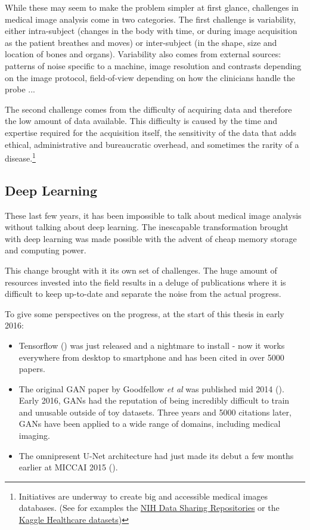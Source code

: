 While these may seem to make the problem simpler at first glance, challenges in medical image analysis come in two categories. The first challenge is variability, either intra-subject (changes in the body with time, or during image acquisition as the patient breathes and moves) or inter-subject (in the shape, size and location of bones and organs). Variability also comes from external sources: patterns of noise specific to a machine, image resolution and contrasts depending on the image protocol, field-of-view depending on how the clinicians handle the probe ... 

The second challenge comes from the difficulty of acquiring data and therefore the low amount of data available. This difficulty is caused by the time and expertise required for the acquisition itself, the sensitivity of the data that adds ethical, administrative and bureaucratic overhead, and sometimes the rarity of a disease.\footnote{Initiatives are underway to create big and accessible medical images databases. (See for examples the \href{https://www.nlm.nih.gov/NIHbmic/nih_data_sharing_repositories.html}{NIH Data Sharing Repositories} or the \href{https://www.kaggle.com/datasets?tagids=4202}{Kaggle Healthcare datasets})}

\subsection{Deep Learning}

These last few years, it has been impossible to talk about medical image analysis without talking about deep learning. The inescapable transformation brought with deep learning was made possible with the advent of cheap memory storage and computing power. %

This change brought with it its own set of challenges. The huge amount of resources invested into the field results in a deluge of publications where it is difficult to keep up-to-date and separate the noise from the actual progress.

To give some perspectives on the progress, at the start of this thesis in early 2016: 
\begin{itemize}
    \item Tensorflow (\textcite{tensorflow2015}) was just released and a nightmare to install - now it works everywhere from desktop to smartphone and has been cited in over 5000 papers.
    \item The original GAN paper by Goodfellow \textit{et al} was published mid 2014 (\textcite{goodfellow2014}). Early 2016, GANs had the reputation of being incredibly difficult to train and unusable outside of toy datasets. Three years and 5000 citations later, GANs have been applied to a wide range of domains, including medical imaging.
    \item The omnipresent U-Net architecture had just made its debut a few months earlier at MICCAI 2015 (\textcite{ronneberger2015MICCAI}).
\end{itemize}

